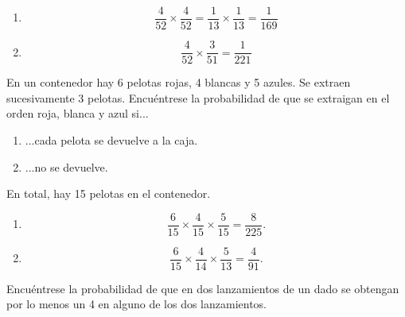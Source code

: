 \begin{solucion}
	\label{solucion:2.3}
	\begin{enumerate}
		\item \begin{equation} \dfrac{4}{52}\times\dfrac{4}{52} = \dfrac{1}{13}\times \dfrac{1}{13} = \dfrac{1}{169} \end{equation}
		\item \begin{equation} \dfrac{4}{52}\times\dfrac{3}{51} = \dfrac{1}{221} \end{equation}
	\end{enumerate}
\end{solucion}


\begin{problema}
	\label{problema:2.4}
	En un contenedor hay 6 pelotas rojas, 4 blancas y 5 azules. Se extraen sucesivamente 3 pelotas. Encuéntrese la probabilidad de que se extraigan en el orden roja, blanca y azul si...
	\begin{enumerate}
		\item ...cada pelota se devuelve a la caja.
		\item ...no se devuelve.
	\end{enumerate}
	
\end{problema}

\begin{solucion}
	\label{solucion:2.4}
	En total, hay 15 pelotas en el contenedor.
	\begin{enumerate}
		\item 
		\begin{equation}
			\dfrac{6}{15}\times\dfrac{4}{15}\times\dfrac{5}{15}
			=\dfrac{8}{225}.
		\end{equation}
	\item
	\begin{equation}
		\dfrac{6}{15}\times\dfrac{4}{14}\times\dfrac{5}{13}
		=\dfrac{4}{91}.
	\end{equation}
	\end{enumerate}
\end{solucion}


\begin{problema}
	\label{problema:2.5}
	Encuéntrese la probabilidad de que en dos lanzamientos de un dado se obtengan por lo menos un 4 en alguno de los dos lanzamientos.
\end{problema}


